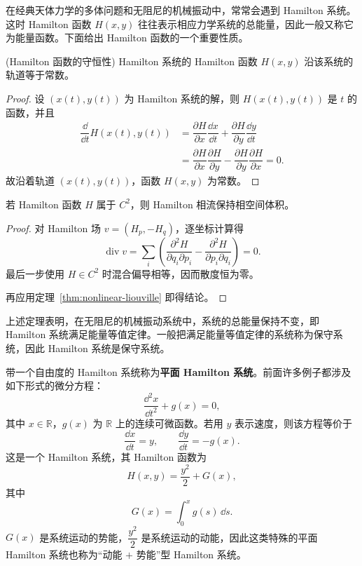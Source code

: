 在经典天体力学的多体问题和无阻尼的机械振动中，常常会遇到 Hamilton 系统。这时 Hamilton 函数 $H(x,y)$ 往往表示相应力学系统的总能量，因此一般又称它为能量函数。下面给出 Hamilton 函数的一个重要性质。

\begin{theorem}(Hamilton 函数的守恒性)\label{thm:Hamilton函数沿轨道守恒}
	Hamilton 系统的 Hamilton 函数 $H(x,y)$ 沿该系统的轨道等于常数。
\end{theorem}

\begin{proof}
	设 $(x(t),y(t))$ 为 Hamilton 系统的解，则 $H(x(t),y(t))$ 是 $t$ 的函数，并且
	\[
	\begin{aligned}
		\dfrac{\dd}{\dd t}H(x(t),y(t))
		&=\dfrac{\partial H}{\partial x}\dfrac{\dd x}{\dd t}
		 +\dfrac{\partial H}{\partial y}\dfrac{\dd y}{\dd t}\\
		&=\dfrac{\partial H}{\partial x}\dfrac{\partial H}{\partial y}
		 -\dfrac{\partial H}{\partial y}\dfrac{\partial H}{\partial x}=0.
	\end{aligned}
	\]
	故沿着轨道 $(x(t),y(t))$，函数 $H(x,y)$ 为常数。
\end{proof}

\begin{corollary}[Hamilton相流保持体积]\label{cor:hamilton-volume}
若 Hamilton 函数 $H$ 属于 $C^2$，则 Hamilton 相流保持相空间体积。
\end{corollary}
\begin{proof}
对 Hamilton 场 $v=(H_p,-H_q)$，逐坐标计算得
\[
 \operatorname{div}v
 =\sum_i\left(\frac{\partial^2H}{\partial q_i\partial p_i}
 -\frac{\partial^2H}{\partial p_i\partial q_i}\right)=0.
\]
最后一步使用 $H\in C^2$ 时混合偏导相等，因而散度恒为零。

再应用定理~\ref{thm:nonlinear-liouville} 即得结论。
\end{proof}

上述定理表明，在无阻尼的机械振动系统中，系统的总能量保持不变，即 Hamilton 系统满足能量等值定律。一般把满足能量等值定律的系统称为保守系统，因此 Hamilton 系统是保守系统。

带一个自由度的 Hamilton 系统称为\textbf{平面 Hamilton 系统}。前面许多例子都涉及如下形式的微分方程：
\[
	\dfrac{\dd^2x}{\dd t^2}+g(x)=0,
\]
其中 $x\in\mathbb R$，$g(x)$ 为 $\mathbb R$ 上的连续可微函数。若用 $y$ 表示速度，则该方程等价于
\[
	\dfrac{\dd x}{\dd t}=y,
	\qquad
	\dfrac{\dd y}{\dd t}=-g(x).
\]
这是一个 Hamilton 系统，其 Hamilton 函数为
\[
	H(x,y)=\dfrac{y^2}{2}+G(x),
\]
其中
\[
	G(x)=\int_0^x g(s)\,\dd s.
\]
$G(x)$ 是系统运动的势能，$\dfrac{y^2}{2}$ 是系统运动的动能，因此这类特殊的平面 Hamilton 系统也称为“动能 $+$ 势能”型 Hamilton 系统。

